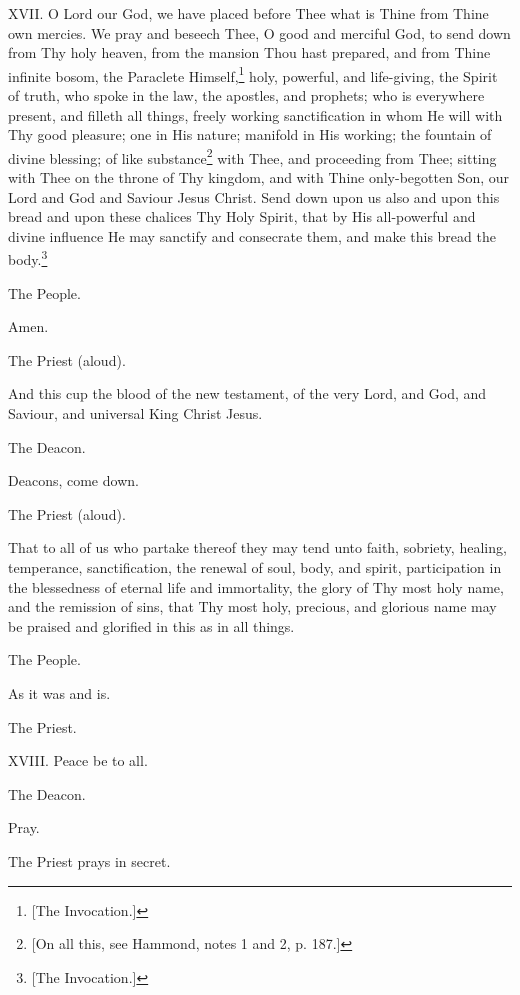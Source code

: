XVII. O Lord our God, we have placed before Thee what is Thine from Thine own mercies. We pray and beseech Thee, O good and merciful God, to send down from Thy holy heaven, from the mansion Thou hast prepared, and from Thine infinite bosom, the Paraclete Himself,\footnote{\par{}  [The Invocation.]} holy, powerful, and life-giving, the Spirit of truth, who spoke in the law, the apostles, and prophets; who is everywhere present, and filleth all things, freely working sanctification in whom He will with Thy good pleasure; one in His nature; manifold in His working; the fountain of divine blessing; of like substance\footnote{\par{}  [On all this, see Hammond, notes 1 and 2, p. 187.]} with Thee, and proceeding from Thee; sitting with Thee on the throne of Thy kingdom, and with Thine only-begotten Son, our Lord and God and Saviour Jesus Christ. Send down upon us also and upon this bread and upon these chalices Thy Holy Spirit, that by His all-powerful and divine influence He may sanctify and consecrate them, and make this bread the body.\footnote{\par{}  [The Invocation.]}

The People.

Amen.

The Priest (aloud).

And this cup the blood of the new testament, of the very Lord, and God, and Saviour, and universal King Christ Jesus.

The Deacon.

Deacons, come down.

The Priest (aloud).

That to all of us who partake thereof they may tend unto faith, sobriety, healing, temperance, sanctification, the renewal of soul, body, and spirit, participation in the blessedness of eternal life and immortality, the glory of Thy most holy name, and the remission of sins, that Thy most holy, precious, and glorious name may be praised and glorified in this as in all things.

The People.

As it was and is.

The Priest.

XVIII. Peace be to all.

The Deacon.

Pray.

The Priest prays in secret.

